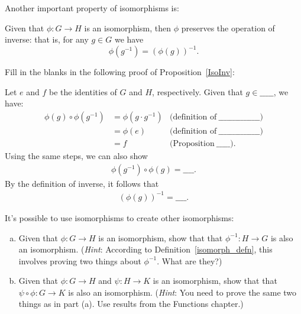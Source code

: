 Another important property of isomorphisms is:

\begin{thm}\label{IsoInv}
Given that  $\phi : G \rightarrow H$ is an  isomorphism, then $\phi$ preserves the operation of inverse: that is, for any $g \in G$ we have
\begin{equation*}
\phi(g^{-1}) = (\phi(g))^{-1}.
\end{equation*}
\end{thm}

\begin{exercise}
Fill in the blanks in the following proof of Proposition~\ref{IsoInv}:
\medskip

\noindent
Let $e$ and $f$ be the identities of $G$ and $H$, respectively. Given that $g \in \_\_\_\_\_$, we have:
\begin{align*}
\phi(g) \circ \phi(g^{-1}) &= \phi(g \cdot g^{-1}) & \textrm{(definition of}~\_\_\_\_\_ \_\_\_\_\_ \_\_\_\_\_)\\
&= \phi(e) &\textrm{(definition of}~\_\_\_\_\_ \_\_\_\_\_ \_\_\_\_\_)\\
&= f &\textrm{(Proposition}~\_\_\_\_\_ ).
\end{align*}
Using the same steps, we can also show
\begin{align*}
\phi(g^{-1}) \circ \phi(g) = \_\_\_\_.
\end{align*}
By the definition of inverse, it follows that
\begin{align*}
( \phi(g))^{-1} = \_\_\_\_.
\end{align*}
\end{exercise} 

It's possible to use isomorphisms to create other isomorphisms:

\begin{exercise}\label{exercise:isomorph:InvCompIso}
\begin{enumerate}[(a)]
\item
Given that  $\phi : G \rightarrow H$ is an  isomorphism, show that that  $\phi^{-1} : H \rightarrow G$ is also an  isomorphism.  (\emph{Hint}: According to Definition~\ref{isomorph_defn}, this involves proving two things about $\phi^{-1}$.  What are they?)
\item
Given that  $\phi : G \rightarrow H$ and $\psi : H \rightarrow K$ is an  isomorphism, show that that  $\psi \circ\phi:G \rightarrow K$ is also an  isomorphism.  (\emph{Hint}: You need to prove the same two things as in part (a).  Use results from the Functions chapter.)
\end{enumerate}
\end{exercise}

